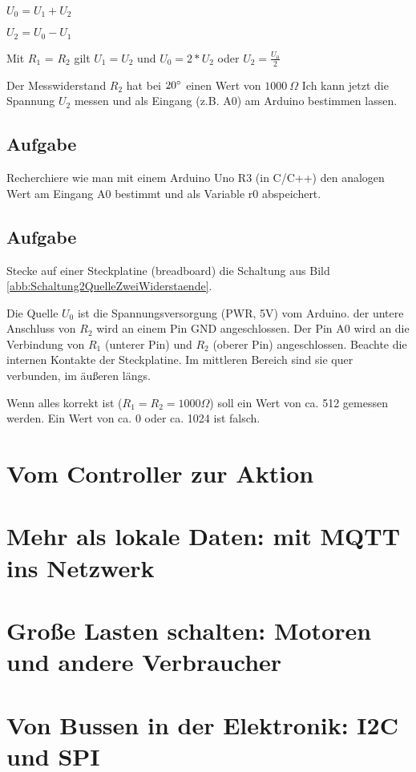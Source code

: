 \documentclass[paper = a4]{scrreprt}
\begin{document}
$U_0 = U_1 + U_2$

$U_2 = U_0 - U_1$

Mit $R_1$ = $R_2$ gilt $U_1 = U_2$ und $U_0 = 2 * U_2$ oder $U_2 = \frac{U_0}{2}$

Der Messwiderstand $R_2$ hat bei $20\degree$ einen Wert von $1000\  \Omega$ Ich kann jetzt die Spannung $U_2$ messen und als Eingang (z.B. A0) am Arduino bestimmen lassen.
\section{Aufgabe}
Recherchiere wie man mit einem Arduino Uno R3 (in C/C++) den analogen Wert am Eingang A0 bestimmt und als Variable r0 abspeichert.

\section{Aufgabe}
Stecke auf einer Steckplatine (breadboard) die Schaltung aus Bild \ref{abb:Schaltung2QuelleZweiWiderstaende}.

Die Quelle $U_0$ ist die Spannungsversorgung (PWR, 5V) vom Arduino. der untere Anschluss von $R_2$ wird an einem Pin GND angeschlossen. Der Pin A0 wird an die Verbindung von $R_1$ (unterer Pin) und $R_2$ (oberer Pin) angeschlossen. Beachte die internen Kontakte der Steckplatine. Im mittleren Bereich sind sie quer verbunden, im äußeren längs.

Wenn alles korrekt ist ($R_1 = R_2 = 1000 \Omega$) soll ein Wert von ca. 512 gemessen werden. Ein Wert von ca. 0 oder ca. 1024 ist falsch.

\chapter{Vom Controller zur Aktion}
\label{sec:AusgabeLed}

\chapter{Mehr als lokale Daten: mit MQTT ins Netzwerk}
\label{sec:Mqtt}

\chapter{Große Lasten schalten: Motoren und andere Verbraucher}
\label{sec:MotorAnsteuern}

\chapter{Von Bussen in der Elektronik: I2C und SPI}
\label{sec:BusseI2cSpi}
\end{document}
